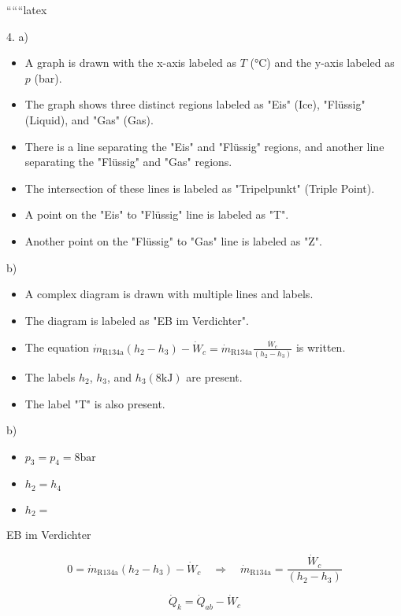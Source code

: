 
``````latex


4. a)

\begin{itemize}
    \item A graph is drawn with the x-axis labeled as $T$ (°C) and the y-axis labeled as $p$ (bar).
    \item The graph shows three distinct regions labeled as "Eis" (Ice), "Flüssig" (Liquid), and "Gas" (Gas).
    \item There is a line separating the "Eis" and "Flüssig" regions, and another line separating the "Flüssig" and "Gas" regions.
    \item The intersection of these lines is labeled as "Tripelpunkt" (Triple Point).
    \item A point on the "Eis" to "Flüssig" line is labeled as "T".
    \item Another point on the "Flüssig" to "Gas" line is labeled as "Z".
\end{itemize}

b)

\begin{itemize}
    \item A complex diagram is drawn with multiple lines and labels.
    \item The diagram is labeled as "EB im Verdichter".
    \item The equation $\dot{m}_{\text{R134a}} (h_2 - h_3) - \dot{W}_c = \dot{m}_{\text{R134a}} \frac{\dot{W}_c}{(h_2 - h_3)}$ is written.
    \item The labels $h_2$, $h_3$, and $h_3 (8 \text{kJ})$ are present.
    \item The label "T" is also present.
\end{itemize}

b)

\begin{itemize}
    \item $p_3 = p_4 = 8 \text{bar}$
    \item $h_2 = h_4$
    \item $h_2 =$
\end{itemize}

EB im Verdichter

\begin{equation}
0 = \dot{m}_{\text{R134a}} (h_2 - h_3) - \dot{W}_c \quad \Rightarrow \quad \dot{m}_{\text{R134a}} = \frac{\dot{W}_c}{(h_2 - h_3)}
\end{equation}

\begin{equation}
\dot{Q}_k = \dot{Q}_{ab} - \dot{W}_c
\end{equation}

